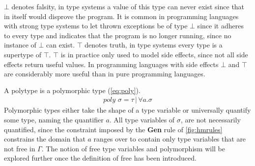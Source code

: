 $\bot$ denotes falsity, in type systems a value of this type can never exist since that in itself would disprove the program.
It is common in programming languages with strong type systems to let thrown exceptions be of type $\bot$ since it adheres to every type and indicates that the program is no longer running, since no instance of $\bot$ can exist.
$\top$ denotes truth, in type systems every type is a supertype of $\top$.
$\top$ is in practice only used to model side effects, since not all side effects return useful values.
In programming languages with side effects $\bot$ and $\top$ are considerably more useful than in pure programming languages.

A polytype is a polymorphic type (\autoref{eq:poly}).
\begin{align}
	poly \,\, \sigma = \tau \,|\, \forall a . \sigma
	\label{eq:poly}
\end{align}
Polymorphic types either take the shape of a type variable or universally quantify some type, naming the quantifier $a$.
All type variables of $\sigma$, are not necessarily quantified, since the constraint imposed by the \textbf{Gen} rule of \autoref{fig:hmrules} constrains the domain that $a$ ranges over to contain only type variables that are not free in $\Gamma$.
The notion of free type variables and polymorphism will be explored further once the definition of free has been introduced.

